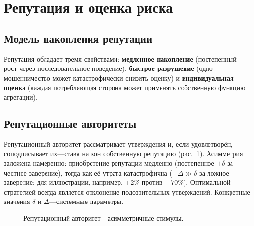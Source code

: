 \documentclass[11pt,a4paper,twocolumn]{article}
\begin{document}
\section{Репутация и оценка риска}

\subsection{Модель накопления репутации}

Репутация обладает тремя свойствами: \textbf{медленное накопление} (постепенный рост через последовательное поведение), \textbf{быстрое разрушение} (одно мошенничество может катастрофически снизить оценку) и \textbf{индивидуальная оценка} (каждая потребляющая сторона может применять собственную функцию агрегации).

\subsection{Репутационные авторитеты}

Репутационный авторитет рассматривает утверждения и, если удовлетворён, соподписывает их---ставя на кон собственную репутацию (рис.~\ref{fig:authority}). Асимметрия заложена намеренно: приобретение репутации медленно (постепенное $+\delta$ за честное заверение), тогда как её утрата катастрофична ($-\Delta \gg \delta$ за ложное заверение; для иллюстрации, например, $+2\%$ против\ $-70\%$). Оптимальной стратегией всегда является отклонение подозрительных утверждений. Конкретные значения $\delta$ и $\Delta$---системные параметры.

\begin{figure}[ht]
\centering
{}
\caption{Репутационный авторитет---асимметричные стимулы.}
\label{fig:authority}
\end{figure}
\end{document}

